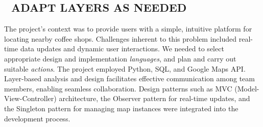 \subsection*{💎 ADAPT LAYERS AS NEEDED {\hfill \cognitive}}
The project's context was to provide users with a simple, intuitive
platform for locating nearby coffee shops. Challenges inherent to this
problem included real-time data updates and dynamic user interactions.
We needed to select appropriate design and implementation
\emph{languages}, and plan and carry out suitable \emph{actions}.
The project employed Python, SQL, and Google Maps API. Layer-based
analysis and design facilitates effective communication among team
members, enabling seamless collaboration.
Design patterns such
as {\scitshape MVC (Model-View-Controller) architecture}, the
{\scitshape Observer} pattern for real-time updates, and the
{\scitshape Singleton} pattern for managing map instances were
integrated into the development process.
